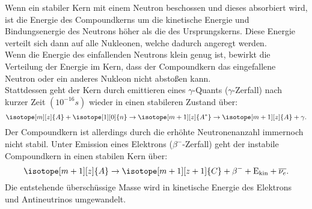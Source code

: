 Wenn ein stabiler Kern mit einem Neutron beschossen und dieses absorbiert wird, ist die Energie des Compoundkerns um die kinetische
Energie und Bindungsenergie des Neutrons höher als die des Ursprungskerns. Diese Energie verteilt sich dann auf alle Nukleonen, welche
dadurch angeregt werden.\\
Wenn die Energie des einfallenden Neutrons klein genug ist, bewirkt die Verteilung der Energie im Kern, dass der Compoundkern das eingefallene
Neutron oder ein anderes Nukleon nicht abstoßen kann. \\
Stattdessen geht der Kern durch emittieren eines $\gamma$-Quants ($\gamma$-Zerfall) nach kurzer Zeit $(10^{-16}\si{s})$ wieder in einen stabileren
Zustand über:
\begin{equation*}
    \isotope[m][z]{A} + \isotope[1][0]{n} \to \isotope[m+1][z]{A^*} \to \isotope[m+1][z]{A} + \gamma.
\end{equation*}
Der Compoundkern ist allerdings durch die erhöhte Neutronenanzahl immernoch nicht stabil. Unter Emission eines Elektrons ($\beta ^-$-Zerfall)
geht der instabile Compoundkern in einen stabilen Kern über:
\begin{equation*}
    \isotope[m+1][z]{A} \to \isotope[m+1][z+1]{C} + \beta ^- + \mathrm{E_{kin}} + \overline{\nu_e}.
\end{equation*}
Die entstehende überschüssige Masse wird in kinetische Energie des Elektrons und Antineutrinos umgewandelt.

